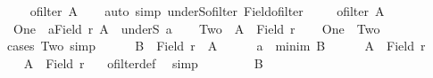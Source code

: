 \begin{isabellebody}
\ \ \isamarkupfalse%
\ {\isachardoublequoteopen}ofilter\ A{\isachardoublequoteclose}\isanewline
\ \ \isamarkupfalse%
\ {\isacharparenleft}{\kern0pt}auto\ simp{\isacharcolon}{\kern0pt}\ underS{\isacharunderscore}{\kern0pt}ofilter\ Field{\isacharunderscore}{\kern0pt}ofilter{\isacharparenright}{\kern0pt}\isanewline
{}\isamarkupfalse%
\isanewline
\ \ \isamarkupfalse%
\ {\isacharasterisk}{\kern0pt}{\isacharcolon}{\kern0pt}\ {\isachardoublequoteopen}ofilter\ A{\isachardoublequoteclose}\isanewline
\ \ \isamarkupfalse%
\ {\isacharquery}{\kern0pt}One\ {\isacharequal}{\kern0pt}\ {\isachardoublequoteopen}{\isacharparenleft}{\kern0pt}{\isasymexists}a{\isasymin}Field\ r{\isachardot}{\kern0pt}\ A\ {\isacharequal}{\kern0pt}\ underS\ a{\isacharparenright}{\kern0pt}{\isachardoublequoteclose}\isanewline
\ \ \isamarkupfalse%
\ {\isacharquery}{\kern0pt}Two\ {\isacharequal}{\kern0pt}\ {\isachardoublequoteopen}{\isacharparenleft}{\kern0pt}A\ {\isacharequal}{\kern0pt}\ Field\ r{\isacharparenright}{\kern0pt}{\isachardoublequoteclose}\isanewline
\ \ \isamarkupfalse%
\ {\isachardoublequoteopen}{\isacharquery}{\kern0pt}One\ {\isasymor}\ {\isacharquery}{\kern0pt}Two{\isachardoublequoteclose}\isanewline
\ \ \isamarkupfalse%
{\isacharparenleft}{\kern0pt}cases\ {\isacharquery}{\kern0pt}Two{\isacharcomma}{\kern0pt}\ simp{\isacharparenright}{\kern0pt}\isanewline
\ \ \ \ \isamarkupfalse%
\ {\isacharquery}{\kern0pt}B\ {\isacharequal}{\kern0pt}\ {\isachardoublequoteopen}{\isacharparenleft}{\kern0pt}Field\ r{\isacharparenright}{\kern0pt}\ {\isacharminus}{\kern0pt}\ A{\isachardoublequoteclose}\isanewline
\ \ \ \ \isamarkupfalse%
\ {\isacharquery}{\kern0pt}a\ {\isacharequal}{\kern0pt}\ {\isachardoublequoteopen}minim\ {\isacharquery}{\kern0pt}B{\isachardoublequoteclose}\isanewline
\ \ \ \ \isamarkupfalse%
\ {\isachardoublequoteopen}A\ {\isasymnoteq}\ Field\ r{\isachardoublequoteclose}\isanewline
\ \ \ \ \isamarkupfalse%
\ \isamarkupfalse%
\ {\isachardoublequoteopen}A\ {\isasymle}\ Field\ r{\isachardoublequoteclose}\ \isamarkupfalse%
\ {\isacharasterisk}{\kern0pt}\ ofilter{\isacharunderscore}{\kern0pt}def\ \isamarkupfalse%
\ simp\isanewline
\ \ \ \ \isamarkupfalse%
\ \isamarkupfalse%
\ {}{\isacharcolon}{\kern0pt}\ {\isachardoublequoteopen}{\isacharquery}{\kern0pt}B\ {\isasymnoteq}\ {\isacharbraceleft}{\kern0pt}{\isacharbraceright}{\kern0pt}{\isachardoublequoteclose}\ \isamarkupfalse%

\end{isabellebody}
